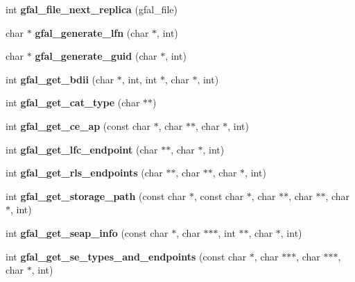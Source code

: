 \begin{CompactItemize}
\item 
int \textbf{gfal\_\-file\_\-next\_\-replica} (gfal\_\-file)\label{group__internal__group_g6de434f3dc9aef814ca6d67c40febbbe}

\item 
char $\ast$ \textbf{gfal\_\-generate\_\-lfn} (char $\ast$, int)\label{group__internal__group_gcd48b57bf9659be5204319918c6f9d20}

\item 
char $\ast$ \textbf{gfal\_\-generate\_\-guid} (char $\ast$, int)\label{group__internal__group_g8311ede197e204e57029165fbc3898d6}

\item 
int \textbf{gfal\_\-get\_\-bdii} (char $\ast$, int, int $\ast$, char $\ast$, int)\label{group__internal__group_gc5a167111fbd4564bdbd7a194a8ebbad}

\item 
int \textbf{gfal\_\-get\_\-cat\_\-type} (char $\ast$$\ast$)\label{group__internal__group_gc08ad608f2ca57ec2883c799a3b6bf11}

\item 
int \textbf{gfal\_\-get\_\-ce\_\-ap} (const char $\ast$, char $\ast$$\ast$, char $\ast$, int)\label{group__internal__group_ged7eddae06a6ae76e7835ad89069f23f}

\item 
int \textbf{gfal\_\-get\_\-lfc\_\-endpoint} (char $\ast$$\ast$, char $\ast$, int)\label{group__internal__group_g6b5c96e786925f6ad93fa57f998173cc}

\item 
int \textbf{gfal\_\-get\_\-rls\_\-endpoints} (char $\ast$$\ast$, char $\ast$$\ast$, char $\ast$, int)\label{group__internal__group_ge98063cb83cedc1a6e6fe0ef8d35c447}

\item 
int \textbf{gfal\_\-get\_\-storage\_\-path} (const char $\ast$, const char $\ast$, char $\ast$$\ast$, char $\ast$$\ast$, char $\ast$, int)\label{group__internal__group_gb3f2c6e488fd2ede0d16bd7f4cdd3549}

\item 
int \textbf{gfal\_\-get\_\-seap\_\-info} (const char $\ast$, char $\ast$$\ast$$\ast$, int $\ast$$\ast$, char $\ast$, int)\label{group__internal__group_ge114394c3fd91f2ab9382dd884dd0693}

\item 
int \textbf{gfal\_\-get\_\-se\_\-types\_\-and\_\-endpoints} (const char $\ast$, char $\ast$$\ast$$\ast$, char $\ast$$\ast$$\ast$, char $\ast$, int)\label{group__internal__group_g2c87f70238deffb3907d5a612e847fd4}


\end{CompactItemize}
